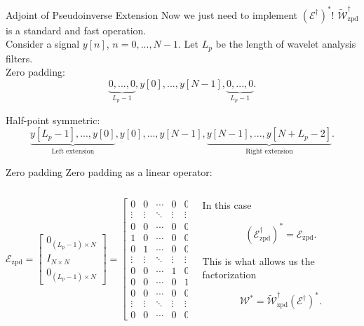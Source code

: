 \documentclass[xcolor=dvipsnames,t]{beamer} %
\begin{document}
\begin{frame}{Adjoint of Pseudoinverse Extension}
   Now we just need to implement $(\mathcal{E}^\dagger)^\ast$!  $\tilde{\mathcal{W}}_\text{zpd}^\dagger$ is a standard and fast operation.\\[.5em]

   Consider a signal $y[n]$, $n=0,...,N-1$.  Let $L_p$ be the length of wavelet analysis filters.\\[.5em]

   Zero padding:
   \[ \underbrace{0, ..., 0}_{L_p-1}, y[0], ..., y[N-1], \underbrace{0, ..., 0}_{L_p-1}. \]

   Half-point symmetric:
   \[ \underbrace{y[L_p-1], ..., y[0]}_\text{Left extension}, y[0], ..., y[N-1], \underbrace{y[N-1], ..., y[N+L_p-2]}_\text{Right extension}. \] 

\end{frame}

\begin{frame}{Zero padding}
   Zero padding as a linear operator:

   \begin{columns}
      \begin{column}{0.7\textwidth}
\[ \mathcal{E}_\text{zpd} = \begin{bmatrix} 0_{(L_p-1)\times N}\\ I_{N\times N}\\ 0_{(L_p-1)\times N}\end{bmatrix} = \begin{bmatrix} 0 & 0 & \cdots & 0 & 0\\ \vdots & \vdots &\ddots & \vdots & \vdots\\ 0 & 0 & \cdots & 0 & 0\\[0.5em] 1 & 0 & \cdots & 0 & 0\\ 0 & 1 & \cdots & 0 & 0\\ \vdots & \vdots & \ddots & \vdots & \vdots\\ 0 & 0 & \cdots & 1 & 0\\ 0 & 0 & \cdots & 0 & 1\\[0.5em] 0 & 0 & \cdots & 0 & 0\\ \vdots & \vdots & \ddots & \vdots & \vdots\\ 0 & 0 & \cdots & 0 & 0\end{bmatrix}. \] 
      \end{column}

      \begin{column}{0.3\textwidth}
         In this case

         \[ \left(\mathcal{E}_\text{zpd}^\dagger\right)^\ast = \mathcal{E}_\text{zpd}. \] 

         \noindent This is what allows us the factorization

         \[ \mathcal{W}^\ast = \tilde{\mathcal{W}}_\text{zpd}^\dagger \left(\mathcal{E}^\dagger\right)^\ast. \] 


      \end{column}
   \end{columns}
\end{frame}
\end{document}
